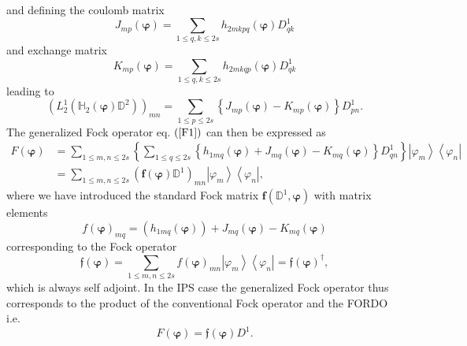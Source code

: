 \documentclass[aps,preprint]{revtex4}%
\begin{document}
and defining the coulomb matrix
\begin{equation}
J_{mp}\left(  \bm{\varphi}\right)  =\sum_{1\leq q,k\leq2s}h_{2mkpq}\left(
\bm{\varphi}\right)  D_{qk}^{1}%
\end{equation}
and exchange matrix
\begin{equation}
K_{mp}\left(  \bm{\varphi}\right)  =\sum_{1\leq q,k\leq2s}h_{2mkqp}\left(
\bm{\varphi}\right)  D_{qk}^{1}%
\end{equation}
leading to
\begin{equation}
\left(  L_{2}^{1}\left(  \mathbb{H}_{2}\left(  \bm{\varphi}\right)
\mathbb{D}^{2}\right)  \right)  _{mn}=\sum_{1\leq p\leq2s}\left\{
J_{mp}\left(  \bm{\varphi}\right)  -K_{mp}\left(  \bm{\varphi}\right)
\right\}  D_{pn}^{1}.
\end{equation}
The generalized Fock operator eq. $\left(  \ref{F1}\right)  $ can then be
expressed as
\begin{align}
F\left(  \bm{\varphi}\right)   &  =\sum_{1\leq m,n\leq2s}\left\{  \sum_{1\leq
q\leq2s}\left\{  h_{1mq}\left(  \bm{\varphi}\right)  +J_{mq}\left(
\bm{\varphi}\right)  -K_{mq}\left(  \bm{\varphi }\right)  \right\}  D_{qn}%
^{1}\right\}  \left\vert \varphi_{m}\right\rangle \left\langle \varphi
_{n}\right\vert \nonumber\\
&  =\sum_{1\leq m,n\leq2s}\left(  \bm{f}\left(  \bm{\varphi}\right)
\mathbb{D}^{1}\right)  _{mn}\left\vert \varphi_{m}\right\rangle \left\langle
\varphi_{n}\right\vert ,
\end{align}
where we have introduced the standard Fock matrix $\bm{f}\left(
\mathbb{D}^{1},\bm{\varphi}\right)  $ with matrix elements
\begin{equation}
f\left(  \bm{\varphi}\right)  _{mq}=\left(  h_{1mq}\left(
\bm{\varphi }\right)  \right)  +J_{mq}\left(  \bm{\varphi}\right)
-K_{mq}\left(  \bm{\varphi}\right)
\end{equation}
corresponding to the Fock operator
\begin{equation}
\mathfrak{f}\left(  \bm{\varphi}\right)  =\sum_{1\leq m,n\leq2s}f\left(
\bm{\varphi}\right)  _{mn}\left\vert \varphi_{m}\right\rangle \left\langle
\varphi_{n}\right\vert =\mathfrak{f}\left(  \bm{\varphi}\right)  ^{\dagger},
\end{equation}
which is always self adjoint. In the IPS case the generalized Fock operator
thus corresponds to the product of the conventional Fock operator and the
FORDO i.e.
\begin{equation}
F\left(  \bm{\varphi}\right)  =\mathfrak{f}\left(  \bm{\varphi }\right)
D^{1}.
\end{equation}
\end{document}
